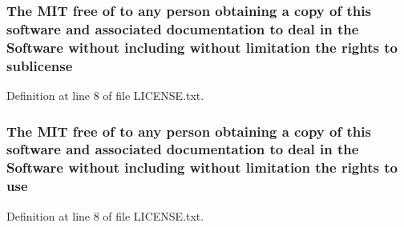 \subsubsection[{\texorpdfstring{sublicense}{sublicense}}]{\setlength{\rightskip}{0pt plus 5cm}The M\+IT free of to any person obtaining a {\bf copy} of this software and associated documentation to deal in the {\bf Software} without including without limitation the rights to sublicense}\hypertarget{LICENSE_8txt_af9fad5470a0b4e968d19b11b7c643fdb}{}\label{LICENSE_8txt_af9fad5470a0b4e968d19b11b7c643fdb}


Definition at line 8 of file L\+I\+C\+E\+N\+S\+E.\+txt.

\subsubsection[{\texorpdfstring{use}{use}}]{\setlength{\rightskip}{0pt plus 5cm}The M\+IT free of to any person obtaining a {\bf copy} of this software and associated documentation to deal in the {\bf Software} without including without limitation the rights to use}\hypertarget{LICENSE_8txt_ab8202310c90e99c59d9ea1f58f920a91}{}\label{LICENSE_8txt_ab8202310c90e99c59d9ea1f58f920a91}


Definition at line 8 of file L\+I\+C\+E\+N\+S\+E.\+txt.

